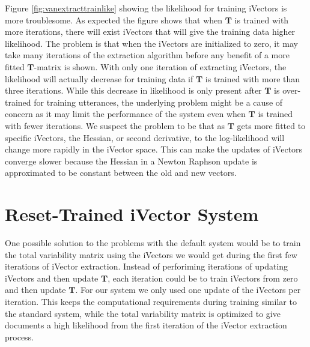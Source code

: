 Figure \ref{fig:vanextracttrainlike} showing the likelihood for training iVectors is more troublesome. As expected the figure shows that when $\mathbf{T}$ is trained with more iterations, there will exist iVectors that will give the training data higher likelihood. The problem is that when the iVectors are initialized to zero, it may take many iterations of the extraction algorithm before any benefit of a more fitted $\mathbf{T}$-matrix is shown. With only one iteration of extracting iVectors, the likelihood will actually decrease for training data if $\mathbf{T}$ is trained with more than three iterations. While this decrease in likelihood is only present after $\mathbf{T}$ is over-trained for training utterances, the underlying problem might be a cause of concern as it may limit the performance of the system even when $\mathbf{T}$ is trained with fewer iterations. We suspect the problem to be that as $\mathbf{T}$ gets more fitted to specific iVectors, the Hessian, or second derivative, to the log-likelihood will change more rapidly in the iVector space. This can make the updates of iVectors converge slower because the Hessian in a Newton Raphson update is approximated to be constant between the old and new vectors. 


\section{Reset-Trained iVector System}

One possible solution to the problems with the default system would be to train the total variability matrix using the iVectors we would get during the first few iterations of iVector extraction. Instead of perforiming iterations of updating iVectors and then update $\mathbf{T}$, each iteration could be to train iVectors from zero and then update $\mathbf{T}$. For our system we only used one update of the iVectors per iteration. This keeps the computational requirements during training similar to the standard system, while the total variability matrix is optimized to give documents a high likelihood from the first iteration of the iVector extraction process. 

